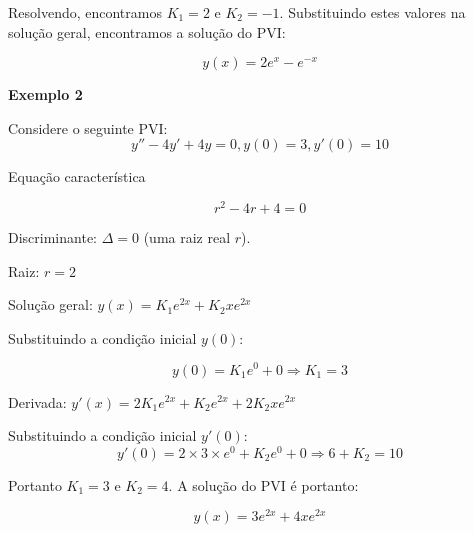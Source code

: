 \documentclass[a4paper]{article}
\begin{document}
\begin{multicols}{2}
Resolvendo, encontramos $K_1=2$ e $K_2=-1$. Substituindo estes valores
na solução geral, encontramos a solução do PVI:

\begin{displaymath}
  y(x) =  2e^x -e^{-x}
\end{displaymath}

\hrulefill

{\bf Exemplo 2}

Considere o seguinte PVI:
\begin{displaymath}
  y''-4y' +4y=0, y(0)=3, y'(0)=10
\end{displaymath}

Equação característica

\begin{displaymath}
  r^2-4r+4=0
\end{displaymath}

Discriminante: $\Delta=0$ (uma raiz real $r$).

Raiz: $r=2$

Solução geral: $y(x) = K_1e^{2x} + K_2xe^{2x}$

Substituindo a condição inicial $y(0)$:

\begin{displaymath}
  y(0) = K_1e^0 + 0 \Rightarrow K_1=3
\end{displaymath}

Derivada: $y'(x) = 2K_1e^{2x} + K_2e^{2x} + 2K_2xe^{2x}$

Substituindo a condição inicial $y'(0)$:
\begin{displaymath}
  y'(0) = 2\times 3\times e^0 + K_2e^0 + 0 \Rightarrow 6+ K_2=10
\end{displaymath}

Portanto $K_1=3$ e $K_2=4$. A solução do PVI é portanto:

\begin{displaymath}
  y(x) = 3e^{2x} + 4xe^{2x}
\end{displaymath}


\end{multicols}
\end{document}
